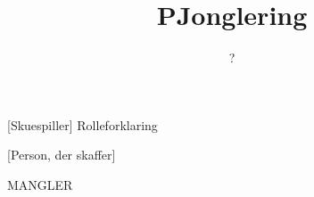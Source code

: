 \documentclass[a4paper,11pt]{article}
\title{PJonglering}
\author{?}
\begin{document}
\maketitle

\begin{roles}
[Skuespiller] Rolleforklaring
\end{roles}

\begin{props}
[Person, der skaffer]
\end{props}


\begin{sketch}

MANGLER

\end{sketch}
\end{document}
